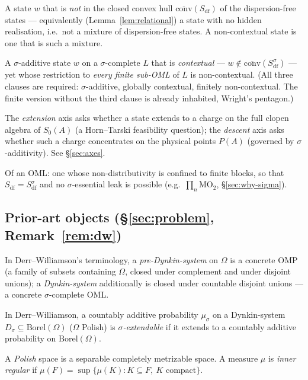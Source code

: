 \documentclass[11pt,reqno]{amsart}
\theoremstyle{plain}
\theoremstyle{definition}
\theoremstyle{remark}
\begin{document}
\begin{description}[style=nextline, leftmargin=1.5em, itemsep=3pt]
\item[Contextual state.]
  A state $w$ that is \emph{not} in the closed convex hull
  $\overline{\mathrm{conv}}(S_{\mathrm{df}})$ of the dispersion-free states ---
  equivalently (Lemma~\ref{lem:relational}) a state with no hidden realisation, i.e.\
  not a mixture of dispersion-free states. A non-contextual state is one that is such
  a mixture.
\item[$\sigma$-essentially contextual state.]
  A $\sigma$-additive state $w$ on a $\sigma$-complete $L$ that is \emph{contextual}
  --- $w\notin\overline{\mathrm{conv}}(S_{\mathrm{df}}^\sigma)$ --- yet whose
  restriction to \emph{every finite sub-OML} of $L$ is non-contextual. (All three
  clauses are required: $\sigma$-additive, globally contextual, finitely
  non-contextual. The finite version without the third clause is already inhabited,
  Wright's pentagon.)
\item[Extension axis; descent axis.]
  The \emph{extension} axis asks whether a state extends to a charge on the full
  clopen algebra of $S_0(A)$ (a Horn--Tarski feasibility question); the
  \emph{descent} axis asks whether such a charge concentrates on the physical points
  $P(A)$ (governed by $\sigma$-additivity). See \S\ref{sec:axes}.
\item[Segregated.]
  Of an OML: one whose non-distributivity is confined to finite blocks, so that
  $S_{\mathrm{df}}=S_{\mathrm{df}}^\sigma$ and no $\sigma$-essential leak is possible
  (e.g.\ $\prod_n\mathrm{MO}_2$, \S\ref{sec:why-sigma}).
\end{description}

\subsection*{Prior-art objects (\S\ref{sec:problem}, Remark~\ref{rem:dw})}

\begin{description}[style=nextline, leftmargin=1.5em, itemsep=3pt]
\item[Pre-Dynkin-system; Dynkin-system.]
  In Derr--Williamson's terminology, a \emph{pre-Dynkin-system} on $\Omega$ is a
  concrete OMP (a family of subsets containing $\Omega$, closed under complement and
  under disjoint unions); a \emph{Dynkin-system} additionally is closed under
  countable disjoint unions --- a concrete $\sigma$-complete OML.
\item[$\sigma$-extendable.]
  In Derr--Williamson, a countably additive probability $\mu_\sigma$ on a
  Dynkin-system $D_\sigma\subseteq\mathrm{Borel}(\Omega)$ ($\Omega$ Polish) is
  \emph{$\sigma$-extendable} if it extends to a countably additive probability on
  $\mathrm{Borel}(\Omega)$.
\item[Polish space; inner regular.]
  A \emph{Polish} space is a separable completely metrizable space. A measure $\mu$
  is \emph{inner regular} if $\mu(F)=\sup\{\mu(K):K\subseteq F,\ K\text{ compact}\}$.
\end{description}



\end{document}
